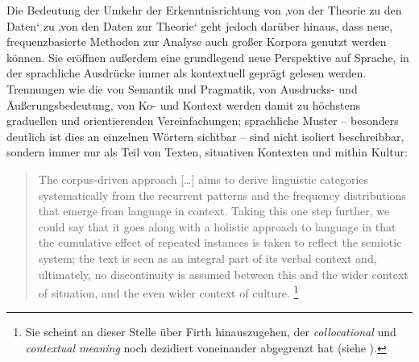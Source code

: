 Die Bedeutung der Umkehr der Erkenntnisrichtung von ‚von der Theorie zu den Daten` zu ‚von den Daten zur Theorie` geht jedoch darüber hinaus, dass neue, frequenzbasierte Methoden zur Analyse auch großer Korpora genutzt werden können. Sie eröffnen außerdem eine grundlegend neue Perspektive auf Sprache, in der sprachliche Ausdrücke immer als kontextuell geprägt gelesen werden. Trennungen wie die von Semantik und Pragmatik, von Ausdrucks- und Äußerungsbedeutung, von Ko- und Kontext werden damit zu höchstens graduellen und orientierenden Vereinfachungen; sprachliche Muster -- besonders deutlich ist dies an einzelnen Wörtern sichtbar -- sind nicht isoliert beschreibbar, sondern immer nur als Teil von Texten, situativen Kontexten und mithin Kultur:

\begin{quote}
The corpus-driven approach {[}\ldots{]} aims to derive linguistic categories systematically from the recurrent patterns and the frequency distributions that emerge from language in context. Taking this one step further, we could say that it goes along with a holistic approach to language in that the cumulative effect of repeated instances is taken to reflect the semiotic system; the text is seen as an integral part of its verbal context and, ultimately, no discontinuity is assumed between this and the wider context of situation, and the even wider context of culture. \autocite[87]{tognini-bonelliCorpusLinguisticsWork2001}\footnote{Sie scheint an dieser Stelle über Firth hinauszugehen, der \emph{collocational} und \emph{contextual meaning} noch dezidiert voneinander abgegrenzt hat (siehe ).}
\end{quote}

